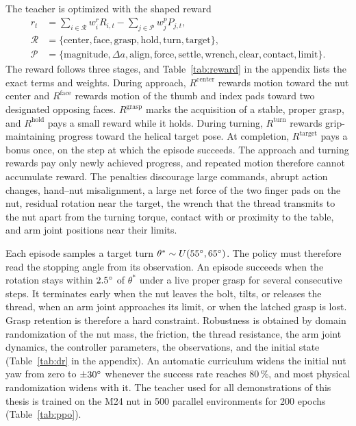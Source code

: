 The teacher is optimized with the shaped reward
\begin{equation}\label{eq:reward}
\begin{aligned}
  r_t&=\sum_{i\in\mathcal{R}} w^{r}_{i}R_{i,t}-\sum_{j\in\mathcal{P}} w^{p}_{j}P_{j,t},\\
  \mathcal{R}&=\{\text{center},\text{face},\text{grasp},\text{hold},\text{turn},\text{target}\},\\
  \mathcal{P}&=\{\text{magnitude},\Delta a,\text{align},\text{force},\text{settle},\text{wrench},\text{clear},\text{contact},\text{limit}\}.
\end{aligned}
\end{equation}
The reward follows three stages, and Table~\ref{tab:reward} in the appendix lists the exact terms and weights. During approach, $R^{\mathrm{center}}$ rewards motion toward the nut center and $R^{\mathrm{face}}$ rewards motion of the thumb and index pads toward two designated opposing faces. $R^{\mathrm{grasp}}$ marks the acquisition of a stable, proper grasp, and $R^{\mathrm{hold}}$ pays a small reward while it holds. During turning, $R^{\mathrm{turn}}$ rewards grip-maintaining progress toward the helical target pose. At completion, $R^{\mathrm{target}}$ pays a bonus once, on the step at which the episode succeeds. The approach and turning rewards pay only newly achieved progress, and repeated motion therefore cannot accumulate reward. The penalties discourage large commands, abrupt action changes, hand--nut misalignment, a large net force of the two finger pads on the nut, residual rotation near the target, the wrench that the thread transmits to the nut apart from the turning torque, contact with or proximity to the table, and arm joint positions near their limits.

Each episode samples a target turn $\theta^{*}\sim U(55^\circ,65^\circ)$. The policy must therefore read the stopping angle from its observation. An episode succeeds when the rotation stays within $2.5^\circ$ of $\theta^{*}$ under a live proper grasp for several consecutive steps. It terminates early when the nut leaves the bolt, tilts, or releases the thread, when an arm joint approaches its limit, or when the latched grasp is lost. Grasp retention is therefore a hard constraint. Robustness is obtained by domain randomization of the nut mass, the friction, the thread resistance, the arm joint dynamics, the controller parameters, the observations, and the initial state (Table~\ref{tab:dr} in the appendix). An automatic curriculum widens the initial nut yaw from zero to $\pm30^\circ$ whenever the success rate reaches 80\,\%, and most physical randomization widens with it. The teacher used for all demonstrations of this thesis is trained on the M24 nut in 500 parallel environments for 200 epochs (Table~\ref{tab:ppo}).

